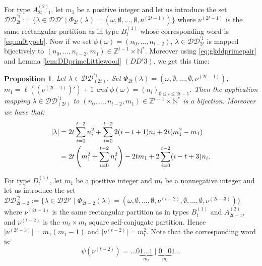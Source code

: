 \documentclass[11pt,letterpaper]{amsart}
\def\bbbz{\mathbb Z}
\def\bbbn{\mathbb N}
\def\ccdd{\mathcal {DD}}
\newtheorem{prop}[df]{Proposition}		%
\numberwithin{equation}{section}
\numberwithin{df}{section}
\begin{document}
For type $A^{(2)}_{2t-1}$, let $m_1$ be a positive integer and let us introduce the set $\ccdd_{2t}^{'1}:=\lbrace \lambda\in\ccdd'\mid \Phi_{2t}(\lambda)=(\omega,\emptyset,\dots,\emptyset,\nu^{(2t-1)})\rbrace$ where $\nu^{(2t-1)}$ is the same rectangular partition as in type $B^{(1)}_{t}$ whose corresponding word is \eqref{eq:nu0typeb}. Now if we set $\phi(\omega)=(n_0,\dots,n_{t-2})$, $\lambda\in \ccdd_{2t}^{'1}$ is mapped bijectively to $(n_0,\dots,n_{t-2},m_1)\in\bbbz^{t-1}\times\bbbn^*$. 
Moreover using \eqref{eq:gkddprimepair} and Lemma \ref{lem:DDprimeLittlewood} $(DD'3)$, we get this time:

\begin{prop}\label{prop:ddprime2t}
Let $\lambda\in \ccdd^{'1}_{(2t)}$. Set $\Phi_{2t}(\lambda)=(\omega,\emptyset,\dots,\emptyset,\nu^{(2t-1)})$, $m_1=\ell(\left(\nu^{(2t-1)}\right)')+1$ and $\phi(\omega)=(n_i)_{0\leq i\leq 2t-1}$. Then the application mapping $\lambda\in\ccdd^{'1}_{(2t)}$ to $(n_0,\dots, n_{t-2},m_1)\in\mathbb{Z}^{t-1}\times\mathbb{N}^*$ is a bijection. Moreover we have that:
\begin{align}
\lvert \lambda \rvert &=2t\sum_{i=0}^{t-2}n_i^2+\sum_{i=0}^{t-2}2(i-t+1)n_i+2t(m_1^2-m_1)\notag\\
&=2t\left(m_1^2+\sum_{i=0}^{t-2}n_i^2\right)-2tm_1+2\sum_{i=0}^{t-2}(i-t+3)n_i.\label{eq:gkddnupairbvtquot}
\end{align}
\end{prop}
%

For type $D^{(1)}_{t}$, let $m_1$ be a positive integer and $m_t$ be a nonnegative integer and let us introduce the set $\ccdd_{2t-2}^{'2}:=\lbrace \lambda\in\ccdd'\mid \Phi_{2t-2}(\lambda)=(\omega,\emptyset,\dots,\emptyset,\nu^{(t-2)},\emptyset,\dots,\emptyset,\nu^{(2t-3)})\rbrace$ where $\nu^{(2t-3)}$ is the same rectangular partition as in types $B^{(1)}_{t}$ and $A^{(2)}_{2t-1}$, and $\nu^{(t-2)}$ is the $m_t\times m_t$ square self-conjugate partition. Hence $\lvert\nu^{(2t-3)}\rvert=m_1(m_1-1)$ and $\lvert\nu^{(t-2)}\rvert=m_t^2$. Note that the corresponding word is:
\begin{equation}\label{eq:nu0typed}
\psi(\nu^{(t-2)})=\dots 0\underbrace{1\dots 1}_{m_t}\mid\underbrace{0\dots 0}_{m_t}1\dots
\end{equation}
\end{document}
